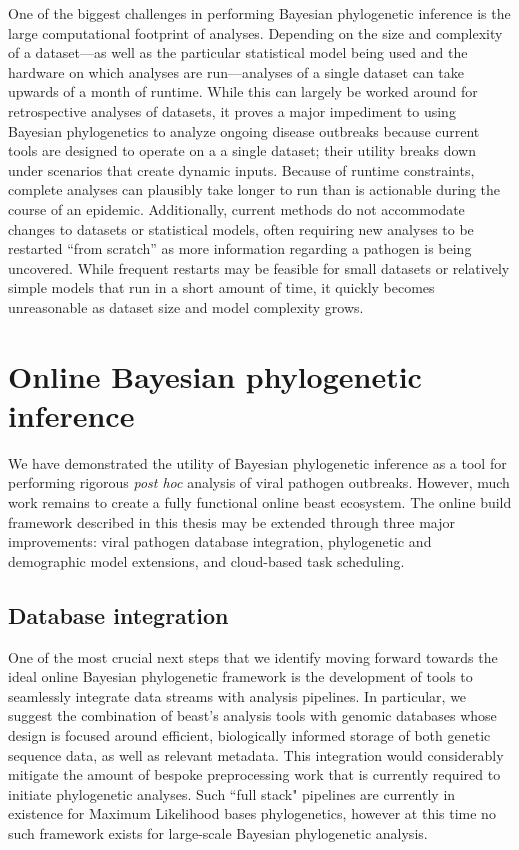 One of the biggest challenges in performing Bayesian phylogenetic inference is the large computational footprint of analyses.
Depending on the size and complexity of a dataset---as well as the particular statistical model being used and the hardware on which analyses are run---analyses of a single dataset can take upwards of a month of runtime.
While this can largely be worked around for retrospective analyses of datasets, it proves a major impediment to using Bayesian phylogenetics to analyze ongoing disease outbreaks because current tools are designed to operate on a a single dataset; their utility breaks down under scenarios that create dynamic inputs.
Because of runtime constraints, complete analyses can plausibly take longer to run than is actionable during the course of an epidemic.
Additionally, current methods do not accommodate changes to datasets or statistical models, often requiring new analyses to be restarted ``from scratch'' as more information regarding a pathogen is being uncovered.
While frequent restarts may be feasible for small datasets or relatively simple models that run in a short amount of time, it quickly becomes unreasonable as dataset size and model complexity grows.

\section{Online Bayesian phylogenetic inference}

We have demonstrated the utility of Bayesian phylogenetic inference as a tool for performing rigorous \textit{post hoc} analysis of viral pathogen outbreaks.
However, much work remains to create a fully functional online \gls{beast} ecosystem.
The online build framework described in this thesis may be extended through three major improvements: viral pathogen database integration, phylogenetic and demographic model extensions, and cloud-based task scheduling.

\subsection{Database integration}

One of the most crucial next steps that we identify moving forward towards the ideal online Bayesian phylogenetic framework is the development of tools to seamlessly integrate data streams with analysis pipelines.
In particular, we suggest the combination of \gls{beast}'s analysis tools with genomic databases whose design is focused around efficient, biologically informed storage of both genetic sequence data, as well as relevant metadata.
This integration would considerably mitigate the amount of bespoke preprocessing work that is currently required to initiate phylogenetic analyses.
Such ``full stack" pipelines are currently in existence for Maximum Likelihood bases phylogenetics\cite{nextstrain}, however at this time no such framework exists for large-scale Bayesian phylogenetic analysis.

